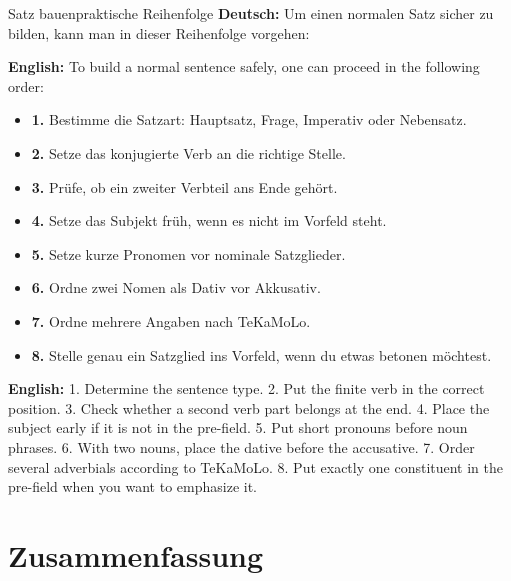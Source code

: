 \documentclass[a4paper,11pt]{article}
\newcommand{\GermanText}[1]{\textbf{Deutsch: }#1\par}
\newcommand{\EnglishText}[1]{{\small\color{SoftGray}\textbf{English: }#1\par}}
\begin{document}
        \begin{grammarentry}{Satz bauen}{praktische Reihenfolge}
            \GermanText{Um einen normalen Satz sicher zu bilden, kann man in dieser Reihenfolge vorgehen:}
            \EnglishText{To build a normal sentence safely, one can proceed in the following order:}
            
            \begin{itemize}
                \item \textbf{1.} Bestimme die Satzart: Hauptsatz, Frage, Imperativ oder Nebensatz.
                \item \textbf{2.} Setze das konjugierte Verb an die richtige Stelle.
                \item \textbf{3.} Prüfe, ob ein zweiter Verbteil ans Ende gehört.
                \item \textbf{4.} Setze das Subjekt früh, wenn es nicht im Vorfeld steht.
                \item \textbf{5.} Setze kurze Pronomen vor nominale Satzglieder.
                \item \textbf{6.} Ordne zwei Nomen als Dativ vor Akkusativ.
                \item \textbf{7.} Ordne mehrere Angaben nach TeKaMoLo.
                \item \textbf{8.} Stelle genau ein Satzglied ins Vorfeld, wenn du etwas betonen möchtest.
            \end{itemize}
            
            \EnglishText{1. Determine the sentence type. 2. Put the finite verb in the correct position. 3. Check whether a second verb part belongs at the end. 4. Place the subject early if it is not in the pre-field. 5. Put short pronouns before noun phrases. 6. With two nouns, place the dative before the accusative. 7. Order several adverbials according to TeKaMoLo. 8. Put exactly one constituent in the pre-field when you want to emphasize it.}
        \end{grammarentry}
    
    
    \section{Zusammenfassung}
        
\end{document}
